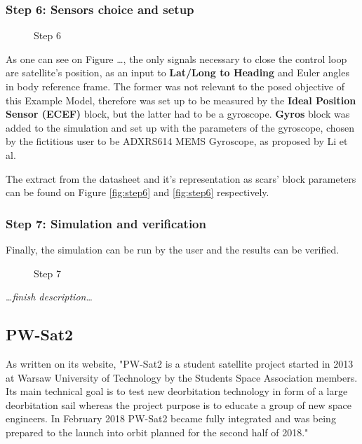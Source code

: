         \subsubsection*{Step 6: Sensors choice and setup}
            \begin{figure}[H]
                \centering
                \qquad
                \caption{Step 6}%
                \label{fig:step6}%
            \end{figure}
            As one can see on Figure \dots, the only signals necessary to close the control loop are satellite's position, as an input to \textbf{Lat/Long to Heading} and Euler angles in body reference frame. The former was not relevant to the posed objective of this Example Model, therefore was set up to be measured by the \textbf{Ideal Position Sensor (ECEF)} block, but the latter had to be a gyroscope. \textbf{Gyros} block was added to the simulation and set up with the parameters of the gyroscope, chosen by the fictitious user to be ADXRS614 MEMS Gyroscope, as proposed by Li et al.\cite{li2013design} 
            
            The extract from the datasheet and it's representation as \ac{scars}' block parameters can be found on Figure \autoref{fig:step6}  and \autoref{fig:step6}  respectively.

        \subsubsection*{Step 7: Simulation and verification}
            Finally, the simulation can be run by the user and the results can be verified.         
            \begin{figure}[H]
                \centering
                \caption{Step 7}%
                \label{fig:step6}%
            \end{figure}
 
            \dots\textit{finish description}\dots

    \subsection{PW-Sat2}
        As written on its website, "PW-Sat2 is a student satellite project started in 2013 at Warsaw University of Technology by the Students Space Association members. Its main technical goal is to test new deorbitation technology in form of a large deorbitation sail whereas the project purpose is to educate a group of new space engineers. In February 2018 PW-Sat2 became fully integrated and was being prepared to the launch into orbit planned for the second half of 2018."\cite{pwsat2website}
        
